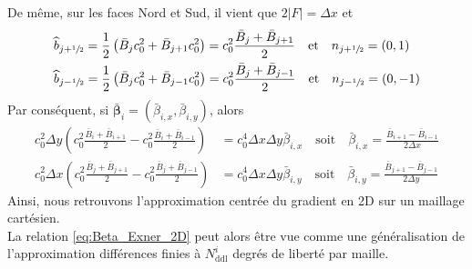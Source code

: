 \documentclass[11pt, a4paper, oneside]{report}
\begin{document}
De même, sur les faces Nord et Sud, il vient que $2 \lvert F \rvert = \Delta x$ et
\begin{equation}
    \begin{aligned}
        & \widehat{b}_{j+\sfrac{1}{2}} = \frac{1}{2} \left(\bar{B}_j c_0^2 + \bar{B}_{j+1} c_0^2 \right) = c_0^2 \frac{\bar{B}_j + \bar{B}_{j+1}}{2} \quad \text{et} \quad n_{j+\sfrac{1}{2}} = (0, 1) \\
        & \widehat{b}_{j-\sfrac{1}{2}} = \frac{1}{2} \left(\bar{B}_j c_0^2 + \bar{B}_{j-1} c_0^2 \right) = c_0^2 \frac{\bar{B}_j + \bar{B}_{j-1}}{2} \quad \text{et} \quad n_{j-\sfrac{1}{2}} = (0, -1)
    \end{aligned}
\end{equation}
Par conséquent, si $\bm{\bar{\beta}}_i = (\bar{\beta}_{i, x}, \bar{\beta}_{i, y})$, alors
\begin{equation}
    \begin{aligned}
        c_0^2 \Delta y \left( c_0^2 \frac{\bar{B}_i + \bar{B}_{i+1}}{2} - c_0^2 \frac{\bar{B}_i + \bar{B}_{i-1}}{2} \right) & = c_0^4 \Delta x \Delta y \bar{\beta}_{i, x} \quad \text{soit} \quad \bar{\beta}_{i, x} = \frac{\bar{B}_{i+1} - \bar{B}_{i-1}}{2 \Delta x} \\
        c_0^2 \Delta x \left( c_0^2 \frac{\bar{B}_j + \bar{B}_{j+1}}{2} - c_0^2 \frac{\bar{B}_j + \bar{B}_{j-1}}{2} \right) & = c_0^4 \Delta x \Delta y \bar{\beta}_{i, y} \quad \text{soit} \quad \bar{\beta}_{i, y} = \frac{\bar{B}_{j+1} - \bar{B}_{j-1}}{2 \Delta y}
    \end{aligned}
\end{equation}
Ainsi, nous retrouvons l'approximation centrée du gradient en 2D sur un maillage cartésien. \\
La relation \eqref{eq:Beta_Exner_2D} peut alors être vue comme une généralisation de l'approximation différences finies à $N_\text{ddl}^i$ degrés de liberté par maille. \\
\end{document}
